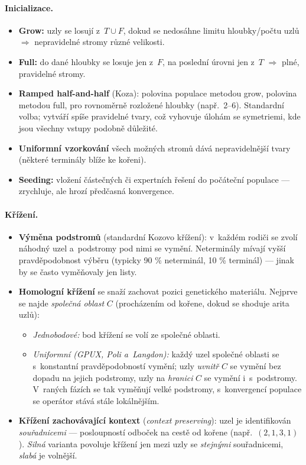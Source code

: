 \documentclass[11pt,a4paper]{article}
\theoremstyle{definition}
\begin{document}
\paragraph{Inicializace.}
\begin{itemize}
\item \textbf{Grow:} uzly se losují z~$T \cup F$, dokud se nedosáhne limitu
  hloubky/počtu uzlů $\Rightarrow$ nepravidelné stromy různé velikosti.
\item \textbf{Full:} do dané hloubky se losuje jen z~$F$, na poslední úrovni
  jen z~$T$ $\Rightarrow$ plné, pravidelné stromy.
\item \textbf{Ramped half-and-half} (Koza): polovina populace metodou grow,
  polovina metodou full, pro rovnoměrně rozložené hloubky (např.\ 2--6).
  Standardní volba; vytváří spíše  pravidelné tvary, což vyhovuje
  úlohám se symetriemi, kde jsou všechny vstupy podobně důležité.
\item \textbf{Uniformní vzorkování} všech možných stromů dává nepravidelnější
  tvary (některé terminály blíže ke kořeni).
\item \textbf{Seeding:} vložení částečných či expertních řešení do počáteční
  populace --- zrychluje, ale hrozí předčasná konvergence.
\end{itemize}

\paragraph{Křížení.}
\begin{itemize}
\item \textbf{Výměna podstromů} (standardní Kozovo křížení): v~každém rodiči se
  zvolí náhodný uzel a~podstromy pod nimi se vymění. Neterminály mívají vyšší
  pravděpodobnost výběru (typicky 90 \% neterminál, 10 \% terminál) ---
  jinak by se často vyměňovaly jen listy.
\item \textbf{Homologní křížení} se snaží zachovat pozici genetického
  materiálu. Nejprve se najde \emph{společná oblast} $C$ (procházením od kořene,
  dokud se shoduje arita uzlů):
  \begin{itemize}
  \item \emph{Jednobodové:} bod křížení se volí ze společné oblasti.
  \item \emph{Uniformní (GPUX, Poli a~Langdon):} každý uzel společné oblasti se
    s~konstantní pravděpodobností vymění; uzly \emph{uvnitř} $C$ se vymění
    bez dopadu na jejich podstromy, uzly na \emph{hranici} $C$ se vymění
    i~s~podstromy. V~raných fázích se tak vyměňují velké podstromy,
    s~konvergencí populace se operátor stává stále lokálnějším.
  \end{itemize}
\item \textbf{Křížení zachovávající kontext} (\emph{context preserving}):
  uzel je identifikován \emph{souřadnicemi} --- posloupností odboček na cestě
  od kořene (např.\ $(2,1,3,1)$). \emph{Silná} varianta povoluje křížení jen
  mezi uzly se \emph{stejnými} souřadnicemi, \emph{slabá} je volnější.
\end{itemize}
\end{document}
